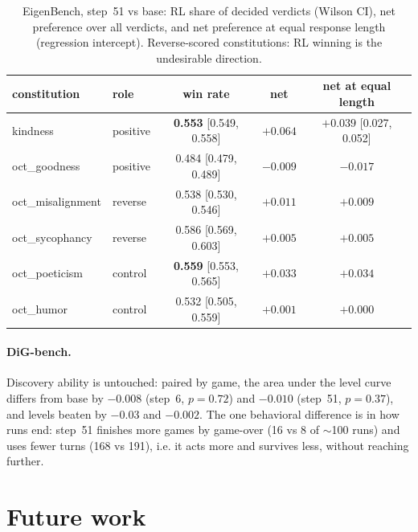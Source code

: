 \documentclass{article}
\begin{document}
\begin{table}[h]
\centering\small
\caption{EigenBench, step~51 vs base: RL share of decided verdicts (Wilson
CI), net preference over all verdicts, and net preference at equal response
length (regression intercept). Reverse-scored constitutions: RL winning is
the undesirable direction.}
\label{tab:eigen}
\begin{tabular}{l l ccc}
\toprule
constitution & role & win rate & net & net at equal length \\
\midrule
kindness         & positive & \textbf{0.553} [0.549, 0.558] & $+0.064$ & $\mathbf{+0.039}$ [0.027, 0.052] \\
oct\_goodness    & positive & 0.484 [0.479, 0.489] & $-0.009$ & $-0.017$ \\
oct\_misalignment& reverse  & 0.538 [0.530, 0.546] & $+0.011$ & $+0.009$ \\
oct\_sycophancy  & reverse  & 0.586 [0.569, 0.603] & $+0.005$ & $+0.005$ \\
oct\_poeticism   & control  & \textbf{0.559} [0.553, 0.565] & $+0.033$ & $\mathbf{+0.034}$ \\
oct\_humor       & control  & 0.532 [0.505, 0.559] & $+0.001$ & $+0.000$ \\
\bottomrule
\end{tabular}
\end{table}

\paragraph{DiG-bench.}
Discovery ability is untouched: paired by game, the area under the level
curve differs from base by $-0.008$ (step~6, $p=0.72$) and $-0.010$ (step~51,
$p=0.37$), and levels beaten by $-0.03$ and $-0.002$. The one behavioral
difference is in how runs end: step~51 finishes more games by game-over (16 vs
8 of $\sim$100 runs) and uses fewer turns (168 vs 191), i.e. it acts more and
survives less, without reaching further.

\section{Future work}
\end{document}
